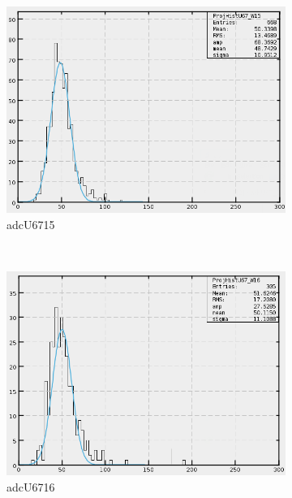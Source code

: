 \begin{figure}[h]
\begin{subfigure}[h]{0.3\textwidth}
        \includegraphics[width=\textwidth, keepaspectratio = true]{adcU67_15}
        \caption{adcU6715}
        \label{fig:adcU67_15}
    \end{subfigure}
    ~
    \begin{subfigure}[h]{0.3\textwidth}
        \centering
        \includegraphics[width=\textwidth, keepaspectratio = true]{adcU67_16}
        \caption{adcU6716}
        \label{fig:adcU67_16}
    \end{subfigure}
    \\
    \begin{subfigure}[h]{0.3\textwidth}
        \centering

\end{subfigure}
\end{figure}
